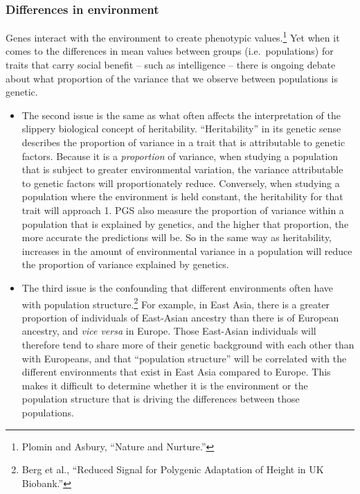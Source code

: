 \documentclass[
]{book}
\begin{document}
\hypertarget{fst-env-sec}{%
\subsubsection{Differences in environment}\label{fst-env-sec}}

Genes interact with the environment to create phenotypic values.\footnote{Plomin and Asbury, {``Nature and {Nurture}.''}} Yet when it comes to the differences in mean values between groups (i.e.~populations) for traits that carry social benefit -- such as intelligence -- there is ongoing debate about what proportion of the variance that we observe between populations is genetic.

\begin{itemize}
\item
  The second issue is the same as what often affects the interpretation of the slippery biological concept of heritability. ``Heritability'' in its genetic sense describes the proportion of variance in a trait that is attributable to genetic factors. Because it is a \emph{proportion} of variance, when studying a population that is subject to greater environmental variation, the variance attributable to genetic factors will proportionately reduce. Conversely, when studying a population where the environment is held constant, the heritability for that trait will approach 1. PGS also measure the proportion of variance within a population that is explained by genetics, and the higher that proportion, the more accurate the predictions will be. So in the same way as heritability, increases in the amount of environmental variance in a population will reduce the proportion of variance explained by genetics.
\item
  The third issue is the confounding that different environments often have with population structure.\footnote{Berg et al., {``Reduced Signal for Polygenic Adaptation of Height in {UK Biobank}.''}} For example, in East Asia, there is a greater proportion of individuals of East-Asian ancestry than there is of European ancestry, and \emph{vice versa} in Europe. Those East-Asian individuals will therefore tend to share more of their genetic background with each other than with Europeans, and that ``population structure'' will be correlated with the different environments that exist in East Asia compared to Europe. This makes it difficult to determine whether it is the environment or the population structure that is driving the differences between those populations.
\end{itemize}
\end{document}
